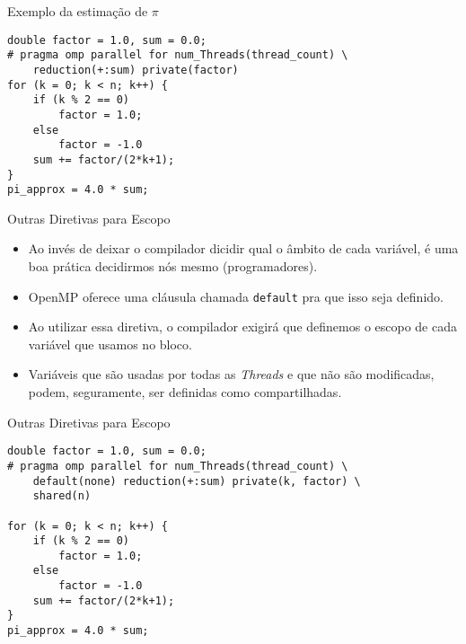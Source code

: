 \begin{frame}[fragile]{Exemplo da estimação de $\pi$}

	\begin{lstlisting}
double factor = 1.0, sum = 0.0;
# pragma omp parallel for num_Threads(thread_count) \
	reduction(+:sum) private(factor)
for (k = 0; k < n; k++) {
	if (k % 2 == 0)
		factor = 1.0;
	else 
		factor = -1.0
	sum += factor/(2*k+1);
}
pi_approx = 4.0 * sum;
	\end{lstlisting}
\end{frame}







\begin{frame}[fragile]{Outras Diretivas para Escopo}
	\begin{itemize}
		\item Ao invés de deixar o compilador dicidir qual o âmbito de cada variável, é uma boa prática decidirmos nós mesmo (programadores).
		\item OpenMP oferece uma cláusula chamada {\tt default} pra que isso seja definido.
		\item Ao utilizar essa diretiva, o compilador exigirá que definemos o escopo de cada variável que usamos no bloco.
			\bigskip
		\item Variáveis que são usadas por todas as \textit{Threads} e que não são modificadas, podem, seguramente, ser definidas como compartilhadas.
	\end{itemize}

\end{frame}





\begin{frame}[fragile]{Outras Diretivas para Escopo}
	\begin{lstlisting}
double factor = 1.0, sum = 0.0;
# pragma omp parallel for num_Threads(thread_count) \
	default(none) reduction(+:sum) private(k, factor) \
	shared(n)

for (k = 0; k < n; k++) {
	if (k % 2 == 0)
		factor = 1.0;
	else 
		factor = -1.0
	sum += factor/(2*k+1);
}
pi_approx = 4.0 * sum;
	\end{lstlisting}
\end{frame}



